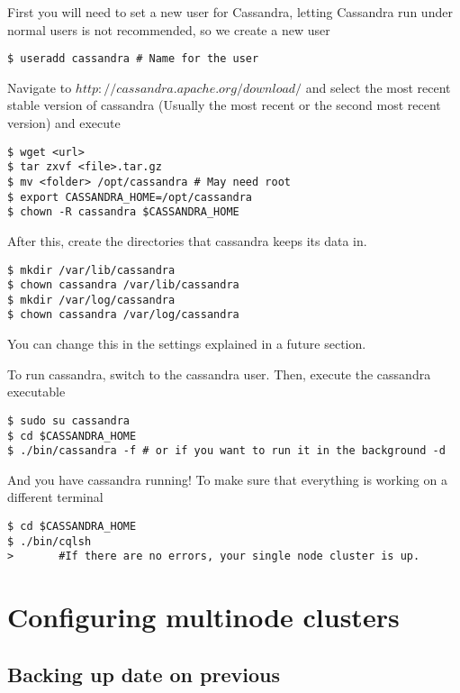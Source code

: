 \documentclass[9pt,twocolumn,twoside]{idsi}
\begin{document}
First you will need to set a new user for Cassandra, letting Cassandra run under normal users is not recommended, so we create a new user

\begin{lstlisting}[breaklines]
$ useradd cassandra # Name for the user
\end{lstlisting}

Navigate to $http://cassandra.apache.org/download/$ and select the most recent stable version of cassandra (Usually the most recent or the second most recent version) and execute

\begin{lstlisting}[breaklines]
$ wget <url>
$ tar zxvf <file>.tar.gz
$ mv <folder> /opt/cassandra # May need root
$ export CASSANDRA_HOME=/opt/cassandra
$ chown -R cassandra $CASSANDRA_HOME
\end{lstlisting}

After this, create the directories that cassandra keeps its data in.

\begin{lstlisting}[breaklines]
$ mkdir /var/lib/cassandra
$ chown cassandra /var/lib/cassandra
$ mkdir /var/log/cassandra
$ chown cassandra /var/log/cassandra
\end{lstlisting}

You can change this in the settings explained in a future section.

To run cassandra, switch to the cassandra user. Then, execute the cassandra executable

\begin{lstlisting}[breaklines]
$ sudo su cassandra
$ cd $CASSANDRA_HOME
$ ./bin/cassandra -f # or if you want to run it in the background -d
\end{lstlisting}

And you have cassandra running! To make sure that everything is working on a different terminal

\begin{lstlisting}[breaklines]
$ cd $CASSANDRA_HOME
$ ./bin/cqlsh
>       #If there are no errors, your single node cluster is up.
\end{lstlisting}

\section{Configuring multinode clusters}

\subsection{Backing up date on previous}
\end{document}
